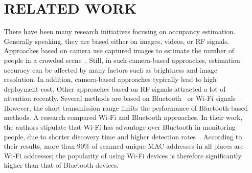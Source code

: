 \chapter{RELATED WORK}

There have been many research initiatives focusing on occupancy estimation.
Generally speaking, they are based either on images, videos, or RF signals.
Approaches based on camera use captured images to estimate the number of people in a crowded scene~\cite{Ma_2013_CVPR,Pe_count}.
Still, in such camera-based approaches, estimation accuracy can be affected by many factors such as brightness and image resolution.
In addition, camera-based approaches typically lead to high deployment cost.
Other approaches based on RF signals attracted a lot of attention recently.
Several methods are based on Bluetooth~\cite{B_ad_hoc} or Wi-Fi signals~\cite{W_power}.
However, the short transmission range limits the performance of Bluetooth-based methods.
A research compared Wi-Fi and Bluetooth approaches.
In their work, the authors stipulate that Wi-Fi has advantage over Bluetooth in monitoring people, due to shorter discovery time and higher detection rates~\cite{quteprints71808}.
According to their results, more than 90\% of scanned unique MAC addresses in all places are Wi-Fi addresses; the popularity of using Wi-Fi devices is therefore significantly higher than that of Bluetooth devices.

